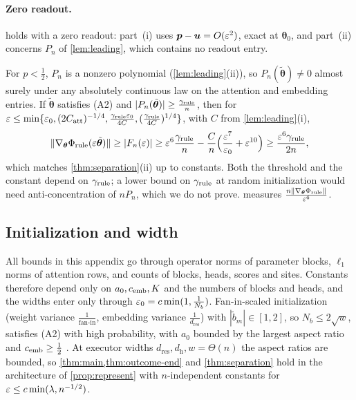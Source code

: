 \paragraph{Zero readout.}\label{rem:zero-readout}  holds with a zero readout: part~(i) uses $\bm p-\bm u=O(\varepsilon^2)$, exact at $\bm\theta_0$, and part~(ii) concerns $P_n$ of
\cref{lem:leading}, which contains no readout entry.


\begin{remark}
\label{rem:generic-rule}
For $p<\frac{1}{2}$, $P_n$ is a nonzero polynomial (\cref{lem:leading}(ii)), so $P_n(\tilde{\bm\theta})\ne0$ almost surely under any absolutely continuous law on
the attention and embedding entries. If $\tilde{\bm\theta}$ satisfies (A2) and $|P_n(\tilde{\bm\theta})|\ge\frac{\gamma_{\mathrm{rule}}}{n}$, then for
$\varepsilon\le\min\{\varepsilon_0,(2C_{\mathrm{att}})^{-1/4},\frac{\gamma_{\mathrm{rule}}\varepsilon_0}{4C},(\frac{\gamma_{\mathrm{rule}}}{4C})^{1/4}\}$, with $C$ from \cref{lem:leading}(i),
\[
 \|\nabla_{\bm\theta}\Phi_{\mathrm{rule}}(\varepsilon\tilde{\bm\theta})\|\ge|F_n(\varepsilon)|\ge\varepsilon^6\frac{\gamma_{\mathrm{rule}}}{n}-\frac{C}{n}\Bigl(\frac{\varepsilon^7}{\varepsilon_0}+\varepsilon^{10}\Bigr)\ge\frac{\varepsilon^6\gamma_{\mathrm{rule}}}{2n},
\]
which matches \cref{thm:separation}(ii) up to constants. Both the threshold and the constant depend on $\gamma_{\mathrm{rule}}$; a lower bound on $\gamma_{\mathrm{rule}}$
at random initialization would need anti-concentration of $nP_n$, which we do not prove.  measures $\frac{n\|\nabla_{\bm\theta}\Phi_{\mathrm{rule}}\|}{\varepsilon^6}$.
\end{remark}

\subsection{Initialization and width}
\label{rem:end-width}
All bounds in this appendix go through operator norms of parameter blocks, $\ell_1$ norms of attention rows, and counts of blocks,
heads, scores and sites. Constants therefore depend only on $a_0,c_{\mathrm{emb}},K$ and the numbers of blocks and heads, and the widths enter only
through $\varepsilon_0=c\min(1,\frac{1}{N_b})$. Fan-in-scaled initialization (weight variance $\frac{1}{\text{fan-in}}$, embedding variance $\frac{1}{d_{\mathrm{res}}}$) with
$|\tilde b_m|\in[1,2]$, so $N_b\le2\sqrt w$, satisfies (A2) with high probability, with $a_0$ bounded by the largest aspect ratio and $c_{\mathrm{emb}}\ge\frac{1}{2}$
\citep[Thms.~4.4.5, 4.6.1]{vershynin2018high}. At executor widths $d_{\mathrm{res}},d_{\mathrm h},w=\Theta(n)$ the aspect ratios are bounded, so
\cref{thm:main,thm:outcome-end} and \cref{thm:separation} hold in the architecture of \cref{prop:represent} with $n$-independent constants for
$\varepsilon\le c\min(\lambda,n^{-1/2})$.


